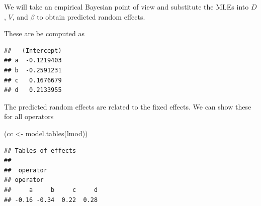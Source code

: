 \documentclass[
  ignorenonframetext,
]{beamer}
\newenvironment{Shaded}{\begin{snugshade}}{\end{snugshade}}
\newcommand{\FunctionTok}[1]{\textcolor[rgb]{0.00,0.00,0.00}{#1}}
\newcommand{\NormalTok}[1]{#1}
\newcommand{\OtherTok}[1]{\textcolor[rgb]{0.56,0.35,0.01}{#1}}
\newcommand{\SpecialCharTok}[1]{\textcolor[rgb]{0.00,0.00,0.00}{#1}}
\begin{document}
\begin{frame}[fragile]{}
\protect\hypertarget{section-8}{}
We will take an empirical Bayesian point of view and substitute the MLEs
into \(D\), \(V\), and \(\beta\) to obtain predicted random effects.

These are be computed as

\vspace{12pt}
\tiny

\begin{Shaded}
\end{Shaded}

\begin{verbatim}
##   (Intercept)
## a  -0.1219403
## b  -0.2591231
## c   0.1676679
## d   0.2133955
\end{verbatim}

\vspace{12pt}
\normalsize

The predicted random effects are related to the fixed effects. We can
show these for all operators

\vspace{12pt}
\tiny

\begin{Shaded}
\begin{Highlighting}[]
\NormalTok{(cc }\OtherTok{\textless{}{-}} \FunctionTok{model.tables}\NormalTok{(lmod))}
\end{Highlighting}
\end{Shaded}

\begin{verbatim}
## Tables of effects
## 
##  operator 
## operator
##     a     b     c     d 
## -0.16 -0.34  0.22  0.28
\end{verbatim}
\end{frame}
\end{document}
